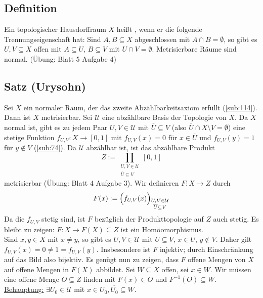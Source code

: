 \subsection[Definition: Normaler Hausdorffraum]{Definition} %
\label{sub:72}
Ein topologischer Hausdorffraum $X$ heißt , wenn er die folgende Trennungseigenschaft hat: Sind $A,B \subseteq X$ abgeschlossen mit
$A \cap B = \emptyset$, so gibt es $U,V \subseteq X$ offen mit $A \subseteq U$, $B \subseteq V$ mit $U \cap V = \emptyset$.
Metrisierbare Räume sind normal. \hfill (Übung: Blatt 5 Aufgabe 4) 

\subsection{Satz (Urysohn)} %
\label{sub:73}
Sei $X$ ein normaler Raum, der das zweite Abzählbarkeitsaxiom erfüllt (\ref{sub:114}). Dann ist $X$ metrisierbar.
Sei $\mathcal{U}$ eine abzählbare Basis der Topologie von $X$. Da $X$ normal ist, gibt es zu jedem Paar $U,V \in \mathcal{U}$ mit $\overline{U} \subseteq V $ (also
$\overline{U} \cap X \setminus V = \emptyset $) eine stetige Funktion $f_{U,V} : X \to [0,1]$ mit $f_{U,V} (x) = 0$ für $x \in \overline{U}$ und
$f_{U,V}(y) = 1$ für $y \not\in V$ (\ref{sub:74}). Da $\mathcal{U}$ abzählbar ist, ist das abzählbare Produkt 
\[
	Z := \prod_{\substack{U,V \in \mathcal{U} \\ \overline{U} \subseteq V}} [0,1]
\]
metrisierbar (Übung: Blatt 4 Aufgabe 3).
Wir definieren $F : X \to Z$ durch
\[
	F(x) := \enbrace[\Big]{f_{U,V}(x)}_{\substack{U,V \in \mathcal{U} \\ \overline{U} \subseteq V}} 
\]
Da die $f_{U,V}$ stetig sind, ist $F$ bezüglich der Produkttopologie auf $Z$ auch stetig. Es bleibt zu zeigen: $F : X \to F(X) \subseteq Z$ ist ein Homöomorphismus.\smallskip \\
Sind $x,y \in X$ mit $x \not= y$, so gibt es $U,V \in \mathcal{U}$ mit $\overline{U} \subseteq V$, $x \in U$, $y \not\in V$. Daher gilt $f_{U,V} (x) = 0 \not= 1 = f_{U,V}(y)$.
Insbesondere ist $F$ injektiv; durch Einschränkung auf das Bild also bijektiv. Es genügt nun zu zeigen, dass $F$ offene Mengen von $X$ auf offene Mengen in $F(X)$ abbildet.
Sei $W \subseteq X$ offen, sei $x \in W$. Wir müssen eine offene Menge $O \subseteq Z$ finden mit $F(x) \in O$ und $F ^{-1}(O) \subseteq W$. \\
\uline{Behauptung:} $\exists U_0 \in \mathcal{U}$ mit $x \in U_0, \overline{U_0} \subseteq W$. \smallskip\\
